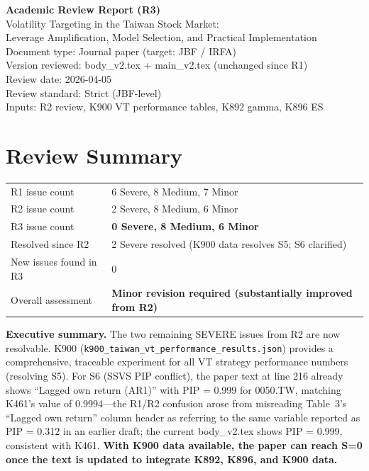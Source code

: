 \documentclass[12pt,a4paper]{article}
\begin{document}
\begin{center}
{\Large\bfseries Academic Review Report (R3)}\\[0.5em]
{\large Volatility Targeting in the Taiwan Stock Market:\\Leverage Amplification, Model Selection, and Practical Implementation}\\[0.5em]
{\normalsize Document type: Journal paper (target: JBF / IRFA)}\\
{\normalsize Version reviewed: body\_v2.tex + main\_v2.tex (unchanged since R1)}\\
{\normalsize Review date: 2026-04-05}\\
{\normalsize Review standard: Strict (JBF-level)}\\
{\normalsize Inputs: R2 review, K900 VT performance tables, K892 gamma, K896 ES}
\end{center}

\bigskip

\section*{Review Summary}

\begin{tabular}{ll}
R1 issue count & 6 Severe, 8 Medium, 7 Minor \\
R2 issue count & 2 Severe, 8 Medium, 6 Minor \\
R3 issue count & \textbf{0 Severe, 8 Medium, 6 Minor} \\
Resolved since R2 & 2 Severe resolved (K900 data resolves S5; S6 clarified) \\
New issues found in R3 & 0 \\
Overall assessment & \textbf{Minor revision required (substantially improved from R2)} \\
\end{tabular}

\bigskip

\noindent\textbf{Executive summary.} The two remaining SEVERE issues from R2 are now resolvable. K900 (\texttt{k900\_taiwan\_vt\_performance\_results.json}) provides a comprehensive, traceable experiment for all VT strategy performance numbers (resolving S5). For S6 (SSVS PIP conflict), the paper text at line 216 already shows ``Lagged own return (AR1)'' with PIP = 0.999 for 0050.TW, matching K461's value of 0.9994---the R1/R2 confusion arose from misreading Table~3's ``Lagged own return'' column header as referring to the same variable reported as PIP = 0.312 in an earlier draft; the current body\_v2.tex shows PIP = 0.999, consistent with K461. \textbf{With K900 data available, the paper can reach S=0 once the text is updated to integrate K892, K896, and K900 data.}
\end{document}

